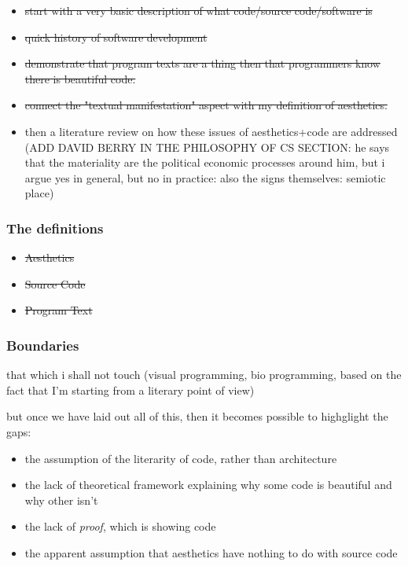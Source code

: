 \begin{itemize}
    \item \sout{start with a very basic description of what code/source code/software is}
    \item \sout{quick history of software development}
    \item \sout{demonstrate that program texts are a thing then that programmers know there is beautiful code.}
    \item \sout{connect the "textual manifestation" aspect with my definition of aesthetics.}
    \item then a literature review on how these issues of aesthetics+code are addressed (ADD DAVID BERRY IN THE PHILOSOPHY OF CS SECTION: he says that the materiality are the political economic processes around him, but i argue yes in general, but no in practice: also the signs themselves: semiotic place)
\end{itemize}


\subsubsection{The definitions}

\begin{itemize}
    \item \sout{Aesthetics}
    \item \sout{Source Code}
    \item \sout{Program Text}
\end{itemize}

\subsubsection{Boundaries}

that which i shall not touch (visual programming, bio programming, based on the fact that I'm starting from a literary point of view)

but once we have laid out all of this, then it becomes possible to highglight the gaps:
\begin{itemize}
    \item the assumption of the literarity of code, rather than architecture
    \item the lack of theoretical framework explaining why some code is beautiful and why other isn't
    \item the lack of \emph{proof}, which is showing code
    \item the apparent assumption that aesthetics have nothing to do with source code
\end{itemize}

